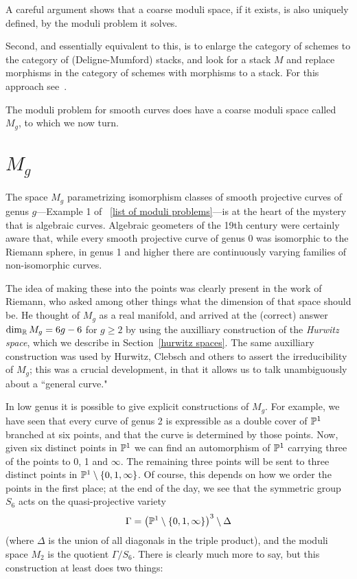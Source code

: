 A careful argument shows that a coarse moduli space, if it exists, is also uniquely defined, by the moduli problem it solves.

Second, and essentially equivalent to this, is to enlarge the category of schemes to the category of (Deligne-Mumford) stacks, and look for
a stack $M$ and replace morphisms in the category of schemes with morphisms to a stack. For this approach see~\cite{Deligne-Mumford}. 

The moduli problem for smooth curves does have a coarse moduli space called $M_g$, to which we now turn.

\section{$M_g$}

The space $M_g$ parametrizing isomorphism classes of smooth projective curves of genus $g$---Example 1 of ~\ref{list of moduli problems}---is at the heart of the mystery that is algebraic curves. 
Algebraic geometers of the 19th century were certainly aware that, while every smooth projective curve of genus 0 was isomorphic to the Riemann sphere, in  genus 1 and higher there are continuously varying families of non-isomorphic curves. 

The idea of
making these into the points was clearly present in the work of Riemann, who asked among other things what the dimension of that space should be. He thought of $M_g$ as a real manifold, and arrived at the (correct) answer $\dim_\RR M_g = 6g-6$ for $g \geq 2$ by using the auxilliary construction of the \emph{Hurwitz space}, which we describe in Section~\ref{hurwitz spaces}. The same auxilliary construction was used by Hurwitz, Clebsch and others to assert the irreducibility of $M_g$; this was a crucial development, in that it allows us to talk unambiguously about a ``general curve."

In low genus it is possible to give explicit constructions of $M_g$. For example, we have seen that every curve of genus 2 is expressible as a double cover of $\PP^1$ branched at six points, and  that the curve is determined by those points. Now, given six distinct points in $\PP^1$ we can find an automorphism of $\PP^1$ carrying three of the points to 0, 1 and $\infty$. The remaining three points will be sent to three distinct points in $\PP^1 \setminus \{0, 1, \infty \} $. Of course, this depends on how we order the points in the first place; at the end of the day, we see that the symmetric group $S_6$ acts on the quasi-projective variety
$$
\Gamma = \left( \PP^1 \setminus \{0, 1, \infty \} \right)^3 \setminus \Delta
$$
(where $\Delta$ is the union of all diagonals in the triple product), and the moduli space $M_2$ is the quotient $\Gamma/S_6$. There is clearly much more to say, but this construction at least does two things:

